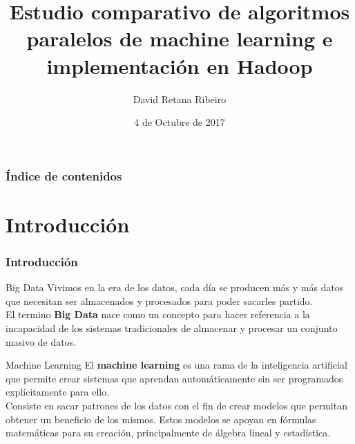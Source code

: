 \documentclass{beamer}
\title[Machine Learning y Big Data]
      {Estudio comparativo de algoritmos paralelos de machine learning e implementación en Hadoop}
\author{David Retana Ribeiro}
\institute[UCM]{Universidad Complutense de Madrid \\ \medskip \texttt{davidret@ucm.es}}
\date{4 de Octubre de 2017}
\begin{document}

\begin{frame} %
\titlepage
\end{frame}


\begin{frame} %
\frametitle{Índice de contenidos}
\tableofcontents
\end{frame}


\section{Introducción}

\begin{frame} %
  \frametitle{Introducción}
  \begin{block}{Big Data}
  Vivimos en la era de los datos, cada día se producen más y más datos  que necesitan ser almacenados y
  procesados para poder sacarles partido.\\
  El termino \textbf{Big Data} nace como un concepto para hacer referencia a la incapacidad de 
  los sistemas tradicionales de almacenar y procesar un conjunto masivo de datos.
  \end{block}
  
  \begin{block}{Machine Learning}
  El \textbf{machine learning} es una rama de la inteligencia artificial que permite crear sistemas que 
  aprendan automáticamente sin ser programados explícitamente para ello.\\
  Consiste en sacar patrones de los datos con el fin de crear modelos que permitan obtener un beneficio
  de los mismos. Estos modelos se apoyan en fórmulas matemáticas para su creación, principalmente de 
  álgebra lineal y estadística.
  \end{block}
\end{frame}

\end{document}

